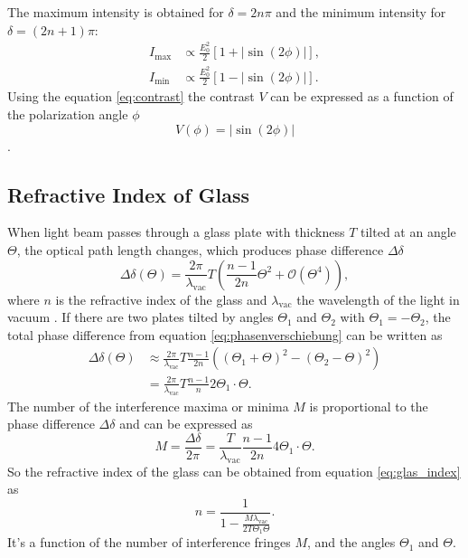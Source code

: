 The maximum intensity is obtained for $\delta = 2n\pi$ and the minimum intensity for $\delta =(2n+1) \pi$:
\begin{align}
    I_\text{max} &\propto \frac{E_0^2}{2} \left[ 1 + |\sin(2\phi)| \right], \\
    I_\text{min} &\propto \frac{E_0^2}{2} \left[ 1 - |\sin(2\phi)| \right].
\end{align}
Using the equation \eqref{eq:contrast} the contrast $V$ can be expressed as a function of the polarization angle $\phi$
\begin{equation}
    V(\phi) = |\sin(2\phi)|
    \label{eq:kontrast_theorie}
\end{equation}
\cite{Hecht2002Optics}.

\subsection{Refractive Index of Glass}
\label{sec:theorie_glas}
When light beam passes through a glass plate with thickness $T$ tilted at an angle $\Theta$, the optical path length changes, which produces phase difference $\Delta \delta$
\begin{equation}
    \Delta \delta (\Theta) = \frac{2\pi}{\lambda_\text{vac}} T  \left(\frac{n - 1}{2n} \Theta^2+ \mathcal{O}(\Theta^4) \right),
    \label{eq:phasenverschiebung}
\end{equation}
where $n$ is the refractive index of the glass and $\lambda_\text{vac}$ the wavelength of the light in vacuum \cite{sample}.
If there are two plates tilted by angles $\Theta_1$ and $\Theta_2$ with $\Theta_1=-\Theta_2$, the total phase difference from equation \eqref{eq:phasenverschiebung} can be written as
\begin{align}
    \Delta \delta (\Theta) &\approx \frac{2\pi}{\lambda_\text{vac}} T \frac{n - 1}{2n} \left( (\Theta_1+\Theta)^2 - (\Theta_2-\Theta)^2 \right) \nonumber \\
    & = \frac{2\pi}{\lambda_\text{vac}} T \frac{n - 1}{n} 2 \Theta_1 \cdot \Theta.
\end{align}
The number of the interference maxima or minima $M$ is proportional to the phase difference $\Delta \delta$ and can be expressed as
\begin{equation}
    M = \frac{\Delta \delta}{2\pi} = \frac{T}{\lambda_\text{vac}} \frac{n - 1}{2n} 4 \Theta_1 \cdot \Theta.
    \label{eq:glas_index}
\end{equation}
So the refractive index of the glass can be obtained from equation \eqref{eq:glas_index} as
\begin{equation}
    n = \frac{1}{1 - \frac{M \lambda_\text{vac}}{2 T \Theta_1 \Theta} }.
    \label{eq:glas_index_n}
\end{equation}
It's a function of the number of interference fringes $M$, and the angles $\Theta_1$ and $\Theta$.

